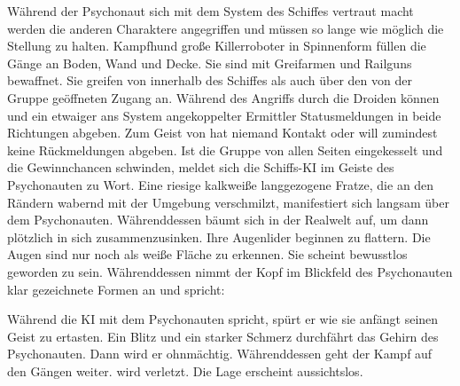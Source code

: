 Während der Psychonaut sich mit dem System des Schiffes vertraut macht werden die anderen Charaktere angegriffen und müssen so lange wie möglich die Stellung zu halten. Kampfhund große Killerroboter in Spinnenform füllen die Gänge an Boden, Wand und Decke. Sie sind mit Greifarmen und Railguns bewaffnet. Sie greifen von innerhalb des Schiffes als auch über den von der Gruppe geöffneten Zugang an. Während des Angriffs durch die Droiden können \ml{} und ein etwaiger ans System angekoppelter Ermittler Statusmeldungen in beide Richtungen abgeben. Zum Geist von \xl{} hat niemand Kontakt oder \ml{} will zumindest keine Rückmeldungen abgeben. Ist die Gruppe von allen Seiten eingekesselt und die Gewinnchancen schwinden, meldet sich die Schiffs-KI im Geiste des Psychonauten zu Wort. Eine riesige kalkweiße langgezogene Fratze, die an den Rändern wabernd mit der Umgebung verschmilzt, manifestiert sich langsam über dem Psychonauten. Währenddessen bäumt sich \xl{} in der Realwelt auf, um dann plötzlich in sich zusammenzusinken. Ihre Augenlider beginnen zu flattern. Die Augen sind nur noch als weiße Fläche zu erkennen. Sie scheint bewusstlos geworden zu sein. Währenddessen nimmt der Kopf im Blickfeld des Psychonauten klar gezeichnete Formen an und spricht:


Während die KI mit dem Psychonauten spricht, spürt er wie sie anfängt seinen Geist zu ertasten. Ein Blitz und ein starker Schmerz durchfährt das Gehirn des Psychonauten. Dann wird er ohnmächtig. Währenddessen geht der Kampf auf den Gängen weiter. \ml{} wird verletzt. Die Lage erscheint aussichtslos.
